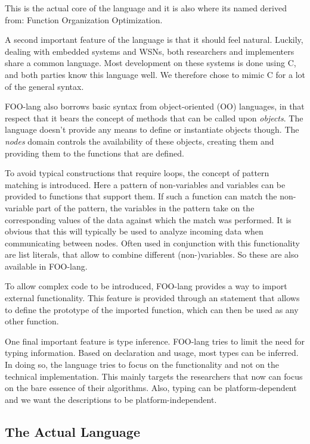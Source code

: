 \documentclass[conference]{IEEEtran}
\begin{document}
This is the actual core of the language and it is also where its named derived
from: Function Organization Optimization.

A second important feature of the language is that it should feel natural.
Luckily, dealing with embedded systems and WSNs, both researchers and
implementers share a common language. Most development on these systems is done
using C, and both parties know this language well. We therefore chose to mimic
C for a lot of the general syntax.

FOO-lang also borrows basic syntax from object-oriented (OO) languages, in that
respect that it bears the concept of methods that can be called upon
\emph{objects}. The language doesn't provide any means to define or instantiate
objects though. The \emph{nodes} domain controls the availability of these
objects, creating them and providing them to the functions that are defined.

To avoid typical constructions that require loops, the concept of pattern
matching is introduced. Here a pattern of non-variables and variables can be
provided to functions that support them. If such a function can match the
non-variable part of the pattern, the variables in the pattern take on the
corresponding values of the data against which the match was performed. It is
obvious that this will typically be used to analyze incoming data when
communicating between nodes. Often used in conjunction with this functionality
are list literals, that allow to combine different (non-)variables. So these
are also available in FOO-lang.

To allow complex code to be introduced, FOO-lang provides a way to import
external functionality. This feature is provided through an statement that
allows to define the prototype of the imported function, which can then be used
as any other function.

One final important feature is type inference. FOO-lang tries to limit the need
for typing information. Based on declaration and usage, most types can be
inferred. In doing so, the language tries to focus on the functionality and not
on the technical implementation. This mainly targets the researchers that now
can focus on the bare essence of their algorithms. Also, typing can be
platform-dependent and we want the descriptions to be platform-independent.

\subsection{The Actual Language}
\label{subsection:language}
\end{document}
